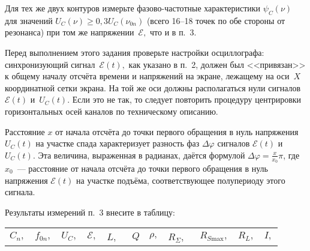 \begin{lab:task}
    \item Для тех же двух контуров измерьте фазово-частотные характеристики
$\psi_C(\nu)$ для значений $U_C(\nu)\ge0,3U_C(\nu_{0n})$ (всего 16--18 точек по
обе стороны от резонанса) при том же напряжении~$\mathcal{E},$ что и в п.~3.

Перед выполнением этого задания проверьте настройки осциллографа:
синхронизующий сигнал~$\mathcal{E}(t),$ как указано в п.~2, должен был
<<привязан>> к общему началу отсчёта времени и напряжений на экране, лежащему на
оси~$X$ координатной сетки экрана. На той же оси должны располагаться нули
сигналов~$\mathcal{E}(t)$ и~$U_C(t)$. Если это не так, то следует повторить
процедуру центрировки горизонтальных осей каналов по техническому описанию.

Расстояние $x$ от начала отсчёта до точки первого обращения в нуль
напряжения $U_C(t)$ на участке спада характеризует разность фаз $\Delta\varphi$
сигналов $\mathcal{E}(t)$ и $U_C(t)$. Эта величина, выраженная в радианах,
даётся формулой $\Delta\varphi=\frac{x}{x_0}\pi$, где $x_0$~--- расстояние
от начала отсчёта до точки первого обращения в нуль напряжения $\mathcal{E}(t)$
на участке подъёма, соответствующее полупериоду этого сигнала.



		    \item Результаты измерений п.~3 внесите в таблицу:\par
\begingroup\small
\noindent\begin{tabular}{|c|c|c|c|c|c|c|c|c|c|c|} 
		                    \hline
		                    $C_n,$ & $f_{0n},$& $U_C,$& $\mathcal{E},$ & $L,$~&
$Q$& $\rho,$ & $R_{\Sigma},$~& $R_{S\text{max}},$& $R_L,$& $I,$\\


\end{tabular}
\end{lab:task}
